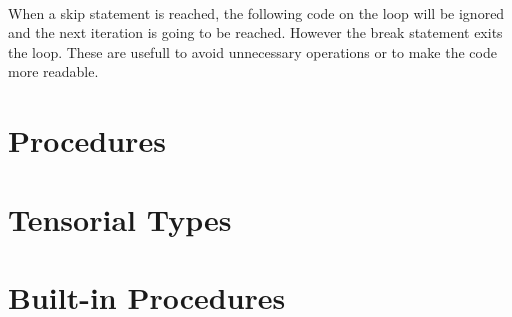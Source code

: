 \paragraph{} When a skip statement is reached, the following code on the loop
will be ignored and the next iteration is going to be reached. However the
break statement exits the loop. These are usefull to avoid unnecessary 
operations or to make the code more readable.

\section{Procedures}

\section{Tensorial Types}

\section{Built-in Procedures}
